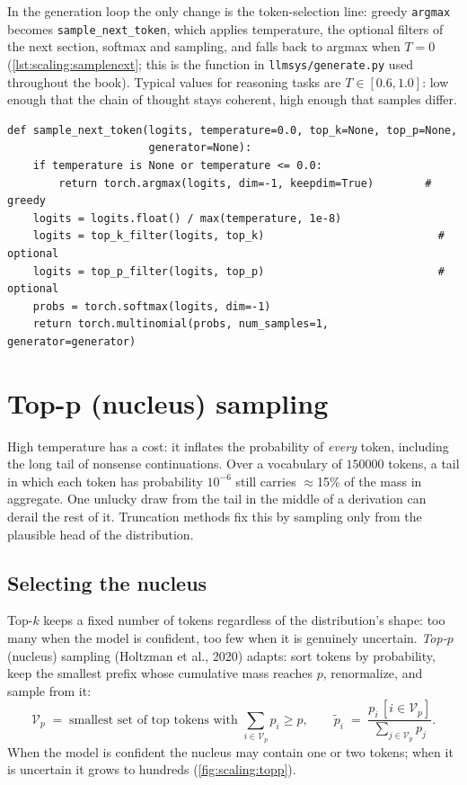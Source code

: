 In the generation loop the only change is the token-selection line: greedy \texttt{argmax}
becomes \texttt{sample\_next\_token}, which applies temperature, the optional filters of the next
section, softmax and sampling, and falls back to argmax when $T = 0$
(\cref{lst:scaling:samplenext}; this is the function in \texttt{llmsys/generate.py} used throughout
the book). Typical values for reasoning tasks are $T \in [0.6, 1.0]$: low enough that the chain of
thought stays coherent, high enough that samples differ.

\begin{lstlisting}[caption={Token selection used by every generator in the book.},label={lst:scaling:samplenext}]
def sample_next_token(logits, temperature=0.0, top_k=None, top_p=None,
                      generator=None):
    if temperature is None or temperature <= 0.0:
        return torch.argmax(logits, dim=-1, keepdim=True)        # greedy
    logits = logits.float() / max(temperature, 1e-8)
    logits = top_k_filter(logits, top_k)                           # optional
    logits = top_p_filter(logits, top_p)                           # optional
    probs = torch.softmax(logits, dim=-1)
    return torch.multinomial(probs, num_samples=1, generator=generator)
\end{lstlisting}

\section{Top-p (nucleus) sampling}\label{sec:scaling:topp}


High temperature has a cost: it inflates the probability of \emph{every} token, including the long
tail of nonsense continuations. Over a vocabulary of $\num{150000}$ tokens, a tail in which each
token has probability $10^{-6}$ still carries $\approx$15\% of the mass in aggregate. One unlucky
draw from the tail in the middle of a derivation can derail the rest of it. Truncation methods fix
this by sampling only from the plausible head of the distribution.

\subsection{Selecting the nucleus}\label{sec:scaling:nucleus}

Top-$k$ keeps a fixed number of tokens regardless of the distribution's shape: too many when the
model is confident, too few when it is genuinely uncertain. \emph{Top-$p$} (nucleus) sampling
(Holtzman et al., 2020) adapts: sort tokens by probability, keep the smallest prefix whose
cumulative mass reaches $p$, renormalize, and sample from it:
\begin{equation}
  \mathcal{V}_p \;=\; \text{smallest set of top tokens with } \textstyle\sum_{i \in \mathcal{V}_p} p_i \ge p,
  \qquad
  \tilde p_i \;=\; \frac{p_i \,[i \in \mathcal{V}_p]}{\sum_{j \in \mathcal{V}_p} p_j}.
\end{equation}
When the model is confident the nucleus may contain one or two tokens; when it is uncertain it
grows to hundreds (\cref{fig:scaling:topp}).

